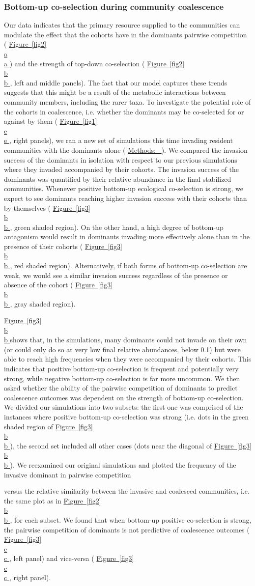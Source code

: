 \documentclass[a4paper,10pt]{article}
\newcommand{\figref}[2][]{%
  \hyperref[{#2}]{%
    Figure~\ref*{#2}%
    \ifx\\#1\\%
    \else
      #1%
    \fi
  }%
}
\newcommand{\methodsref}[1]{%
  \hyperref[{methods:#1}]{%
   Methods:~\nameref*{methods:#1}%
  }%
}
\begin{document}
\subsubsection*{Bottom-up co-selection during community coalescence}

Our data indicates that the primary resource supplied to the communities can modulate
the effect that the cohorts have in the dominants pairwise competition
(\figref[a]{fig2})
and the strength of top-down co-selection
(\figref[b]{fig2}, left and middle panels).
The fact that
our model captures these trends
suggests that this might be a result of the metabolic interactions
between community members, including the rarer taxa.
To investigate the potential role of the cohorts in coalescence,
 i.e. whether the dominants may be co-selected for or against by them
(\figref[e]{fig1}, right panels),
we ran a new set of simulations
this time invading resident communities with the dominants alone
(\methodsref{sim}).
We compared the invasion success of the dominants in isolation with respect to our previous
simulations where they invaded accompanied by their cohorts.
The invasion success of the dominants was quantified by their relative abundance
in the final stabilized communities.
Whenever positive bottom-up ecological co-selection is strong, we expect to see dominants
reaching higher invasion success with their cohorts than by themselves
(\figref[b]{fig3}, green shaded region).
On the other hand, a high degree of bottom-up antagonism would result in dominants
invading more effectively alone than in the presence of their cohorts
(\figref[b]{fig3}, red shaded region).
Alternatively, if both forms of bottom-up co-selection are weak, we would see a similar invasion success
regardless of the presence or absence of the cohort
(\figref[b]{fig3}, gray shaded region).

\figref[b]{fig3} shows that, in the simulations,
many dominants could not invade on their own
(or could only do so at very low final relative abundances, below 0.1)
but were able to reach high frequencies when they were accompanied by their cohorts.
This indicates that positive bottom-up co-selection is frequent and potentially very strong,
while negative bottom-up co-selection is far more uncommon.
We then asked whether the ability of the pairwise competition of dominants
to predict coalescence outcomes was dependent on the strength of bottom-up co-selection.
We divided our simulations into two subsets:
the first one was comprised of the instances where positive bottom-up co-selection was strong
(i.e. dots in the green shaded region of \figref[b]{fig3}),
the second set included all other cases
(dots near the diagonal of \figref[b]{fig3}).
We reexamined our original simulations and plotted the frequency of the invasive dominant
in pairwise competition

versus the relative similarity between
the invasive and coalesced communities,
i.e. the same plot as in \figref[b]{fig2}, for each subset.
We found that when bottom-up positive co-selection is strong,
the pairwise competition of dominants is not predictive of coalescence outcomes
(\figref[c]{fig3}, left panel) and vice-versa (\figref[c]{fig3}, right panel).
\end{document}
